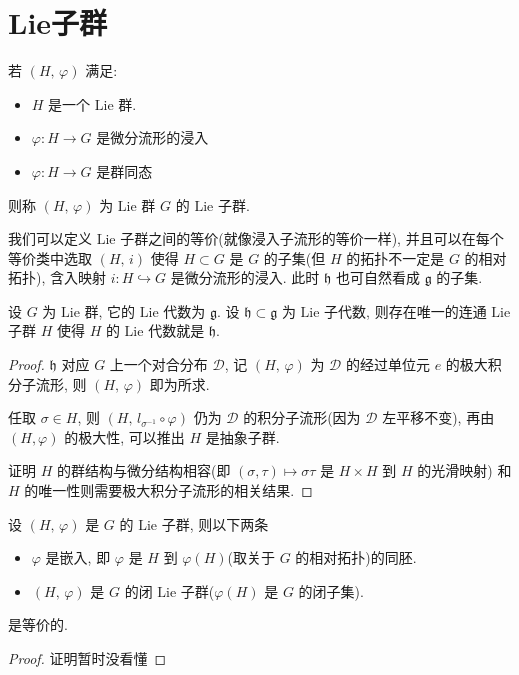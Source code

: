 \section{Lie子群}
    \begin{definition}
        若 $(H,\,\varphi)$ 满足:
        \begin{itemize}
            \item $H$ 是一个 $\mathrm{Lie}$ 群.
            \item $\varphi:H\rightarrow G$ 是微分流形的浸入
            \item $\varphi:H\rightarrow G$ 是群同态
        \end{itemize}
        则称 $(H,\,\varphi)$ 为 $\mathrm{Lie}$ 群 $G$ 的 $\mathrm{Lie}$ 子群.
    \end{definition}
    \begin{remark}
        我们可以定义 $\mathrm{Lie}$ 子群之间的等价(就像浸入子流形的等价一样),
        并且可以在每个等价类中选取 $(H,\,i)$ 使得 $H\subset G$ 是 $G$ 的子集(但 $H$ 的拓扑不一定是 $G$ 的相对拓扑), 含入映射 $i:H\hookrightarrow G$ 是微分流形的浸入.
        此时 $\mathfrak{h}$ 也可自然看成 $\mathfrak{g}$ 的子集.
    \end{remark}
    \begin{theorem}[Lie子代数与连通Lie子群的一一对应]
        设 $G$ 为 $\mathrm{Lie}$ 群, 它的 $\mathrm{Lie}$ 代数为 $\mathfrak{g}$. 设 $\mathfrak{h}\subset\mathfrak{g}$ 为 $\mathrm{Lie}$ 子代数,
        则存在唯一的连通 $\mathrm{Lie}$ 子群 $H$ 使得 $H$ 的 $\mathrm{Lie}$ 代数就是 $\mathfrak{h}$.
    \end{theorem}
    \begin{proof}
        $\mathfrak{h}$ 对应 $G$ 上一个对合分布 $\mathcal{D}$, 记 $(H,\,\varphi)$ 为 $\mathcal{D}$ 的经过单位元 $e$ 的极大积分子流形, 则 $(H,\,\varphi)$ 即为所求.
        
        任取 $\sigma\in H$, 则 $(H,\,l_{\sigma^{-1}}\circ\varphi)$ 仍为 $\mathcal{D}$ 的积分子流形(因为 $\mathcal{D}$ 左平移不变), 再由 $(H,\varphi)$ 的极大性, 可以推出 $H$ 是抽象子群.
        
        证明 $H$ 的群结构与微分结构相容(即 $(\sigma,\tau)\mapsto\sigma\tau$ 是 $H\times H$ 到 $H$ 的光滑映射) 和 $H$ 的唯一性则需要极大积分子流形的相关结果.
    \end{proof}
    \begin{theorem}[闭Lie子群与正则子流形的关系]
        设 $(H,\,\varphi)$ 是 $G$ 的 $\mathrm{Lie}$ 子群, 则以下两条
        \begin{itemize}
            \item $\varphi$ 是嵌入, 即 $\varphi$ 是 $H$ 到 $\varphi(H)$(取关于 $G$ 的相对拓扑)的同胚.
            \item $(H,\,\varphi)$ 是 $G$ 的闭 $\mathrm{Lie}$ 子群($\varphi(H)$ 是 $G$ 的闭子集).
        \end{itemize}
        是等价的.
    \end{theorem}
    \begin{proof}
        证明暂时没看懂
    \end{proof}

